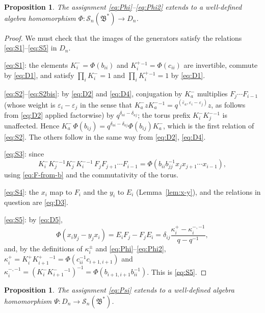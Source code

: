 \documentclass[11pt]{amsart}
\newcommand{\KP}{K^{+}}
\newcommand{\KM}{K^{-}}
\newcommand{\eps}{\varepsilon}
\theoremstyle{plain}
\newtheorem{proposition}[theorem]{Proposition}
\theoremstyle{definition}
\numberwithin{equation}{section}
\begin{document}
\begin{proposition}\label{prop:Phi-wd}
The assignment \eqref{eq:Phi}--\eqref{eq:Phi2} extends to a well-defined
algebra homomorphism
$\Phi:\mathscr S_n(\mathfrak B^*)\to D_n$.
\end{proposition}

\begin{proof}
We must check that the images of the generators satisfy the relations
\eqref{eq:S1}--\eqref{eq:S5} in $D_n$.

\eqref{eq:S1}: the elements $\KM_i=\Phi(b_{ii})$ and $\KP_i^{-1}=\Phi(c_{ii})$
are invertible, commute by \eqref{eq:D1}, and satisfy
$\prod_i\KM_i=1$ and $\prod_i\KP_i^{-1}=1$ by \eqref{eq:D1}.

\eqref{eq:S2}--\eqref{eq:S2bis}: by \eqref{eq:D2} and \eqref{eq:D4},
conjugation by $\KM_a$ multiplies $F_j\cdots F_{i-1}$ (whose weight is
$\eps_i-\eps_j$ in the sense that
$\KM_a z\KM_a^{-1}=q^{(\bar\eps_a,\eps_i-\eps_j)}z$, as follows from
\eqref{eq:D2} applied factorwise) by $q^{\delta_{ai}-\delta_{aj}}$; the torus
prefix $\KM_i\KM_j^{-1}$ is unaffected.  Hence
$\KM_a\,\Phi(b_{ij})=q^{\delta_{ai}-\delta_{aj}}\Phi(b_{ij})\KM_a$, which is
the first relation of \eqref{eq:S2}.  The others follow in the same way from
\eqref{eq:D2}, \eqref{eq:D4}.

\eqref{eq:S3}: since
\[
\KM_i\KM_j^{-1}\KM_j\KM_i^{-1}\,F_jF_{j+1}\cdots F_{i-1}
=\Phi(b_{ii}b_{jj}^{-1}x_jx_{j+1}\cdots x_{i-1}),
\]
using \eqref{eq:F-from-b} and the commutativity of the torus.

\eqref{eq:S4}: the $x_i$ map to $F_i$ and the $y_i$ to $E_i$
(Lemma~\ref{lem:x-y}), and the relations in question are
\eqref{eq:D3}.

\eqref{eq:S5}: by \eqref{eq:D5},
\[
\Phi(x_iy_j-y_jx_i)=E_iF_j-F_jE_i
=\delta_{ij}\frac{\kappa_i^{+}-\kappa_i^{-,-1}}{q-q^{-1}},
\]
and, by the definitions of $\kappa_i^\pm$ and \eqref{eq:Phi}--\eqref{eq:Phi2},
$\kappa_i^{+}=\KP_i\KP_{i+1}^{-1}=\Phi(c_{ii}^{-1}c_{i+1,i+1})$ and
$\kappa_i^{-,-1}=(\KM_i\KM_{i+1}^{-1})^{-1}
=\Phi(b_{i+1,i+1}b_{ii}^{-1})$.  This is \eqref{eq:S5}.
\end{proof}

\begin{proposition}\label{prop:Psi-wd}
The assignment \eqref{eq:Psi} extends to a well-defined algebra homomorphism
$\Psi:D_n\to\mathscr S_n(\mathfrak B^*)$.
\end{proposition}
\end{document}
